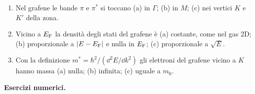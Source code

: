 \documentclass[11pt,a4paper]{article}
\begin{document}
\begin{enumerate}[label=\textbf{R\arabic*.}, leftmargin=2.3em, itemsep=2pt]
(a) il numero di elettroni è dispari; (b) valenza e conduzione si sovrappongono di circa \SI{40}{meV} in punti diversi della zona; (c) tutti i 10
elettroni contribuiscono all'effetto Hall.
\item Nel grafene le bande $\pi$ e $\pi^*$ si toccano
(a) in $\Gamma$; (b) in $M$; (c) nei vertici $K$ e $K'$ della zona.
\item Vicino a $E_{\mathrm F}$ la densità degli stati del grafene è
(a) costante, come nel gas 2D; (b) proporzionale a $|E-E_{\mathrm F}|$ e nulla in $E_{\mathrm F}$; (c) proporzionale a $\sqrt{E}$.
\item Con la definizione $m^*=\hbar^2/(\dd^2E/\dd k^2)$ gli elettroni del grafene vicino a $K$ hanno massa
(a) nulla; (b) infinita; (c) uguale a $m_0$.
\end{enumerate}

\textbf{Esercizi numerici.}
\end{document}
